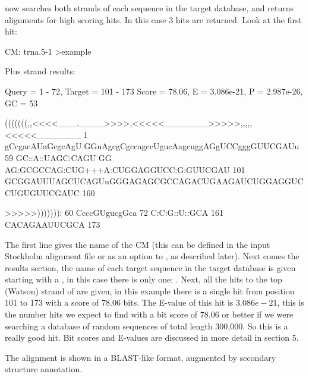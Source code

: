  now searches both strands of each sequence in the
target database, and returns alignments for high scoring hits.  In
this case 3 hits are returned. Look at the first hit:
\begin{sreoutput}
CM: trna.5-1
>example

  Plus strand results:

 Query = 1 - 72, Target = 101 - 173
 Score = 78.06, E = 3.086e-21, P = 2.987e-26, GC =  53

           (((((((,,<<<<___.____>>>>,<<<<<_______>>>>>,,,,,<<<<<_______
         1 gCcgacAUaGcgcAgU.GGuAgcgCgccagccUgucAagcuggAGgUCCgggGUUCGAUu 59      
           GC::A::UAGC:CAGU GG AG:GCGCCAG:CUG+++A:CUGGAGGUCC:G:GUUCGAU 
       101 GCGGAUUUAGCUCAGUuGGGAGAGCGCCAGACUGAAGAUCUGGAGGUCCUGUGUUCGAUC 160     

           >>>>>))))))):
        60 CcccGUgucgGca 72      
           C:C:G::U::GCA
       161 CACAGAAUUCGCA 173     

\end{sreoutput}

The first line gives the name of the CM (this can be defined in the
input Stockholm alignment file or as an option to , as
described later). Next comes the results section, the name of each
target sequence in the target database is given starting with a
\prog{$>$}, in this case there is only one: . Next, all
the hits to the top (Watson) strand of  are given, in
this example there is a single hit from position 101 to 173 with a
score of 78.06 bits. The E-value of this hit is $3.086e-21$, this is
the number hits we expect to find with a bit score of 78.06 or better
if we were searching a database of random sequences of total length
300,000. So this is a really good hit. Bit scores and E-values are
discussed in more detail in section 5.

The alignment is shown in a BLAST-like format, augmented by secondary
structure annotation. 

